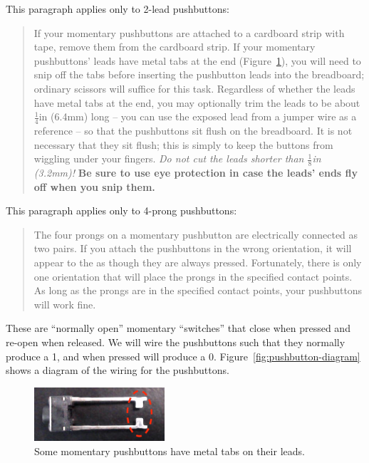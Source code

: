 This paragraph applies only to 2-lead pushbuttons:
\begin{quote}
    If your momentary pushbuttons are attached to a cardboard strip with tape, remove them from the cardboard strip.
    If your momentary pushbuttons' leads have metal tabs at the end (Figure~\ref{fig:pushbutton-tabs}), you will need to snip off the tabs before inserting the pushbutton leads into the breadboard;
    ordinary scissors will suffice for this task.
    Regardless of whether the leads have metal tabs at the end, you may optionally trim the leads to be about $\frac{1}{4}$in (6.4mm) long -- you can use the exposed lead from a jumper wire as a reference -- so that the pushbuttons sit flush on the breadboard.
    It is not necessary that they sit flush;
    this is simply to keep the buttons from wiggling under your fingers.
    \textit{Do not cut the leads shorter than $\mathit{\frac{1}{8}}$in (3.2mm)!}
    \textbf{Be sure to use eye protection in case the leads' ends fly off when you snip them.}
\end{quote}

This paragraph applies only to 4-prong pushbuttons:
\begin{quote}
    The four prongs on a momentary pushbutton are electrically connected as two pairs.
    If you attach the pushbuttons in the wrong orientation, it will appear to the \developmentboard as though they are always pressed.
    Fortunately, there is only one orientation that will place the prongs in the specified contact points.
    As long as the prongs are in the specified contact points, your pushbuttons will work fine.
\end{quote}

These are ``normally open'' momentary ``switches'' that close when pressed and re-open when released.
We will wire the pushbuttons such that they normally produce a 1, and when pressed will produce a 0.
Figure~\ref{fig:pushbutton-diagram} shows a diagram of the wiring for the pushbuttons.

\begin{figure}
    \centering
    \includegraphics[height=2cm]{direct/buttons/pushbutton-tabs}
    \caption{Some momentary pushbuttons have metal tabs on their leads.\label{fig:pushbutton-tabs}}
\end{figure}

